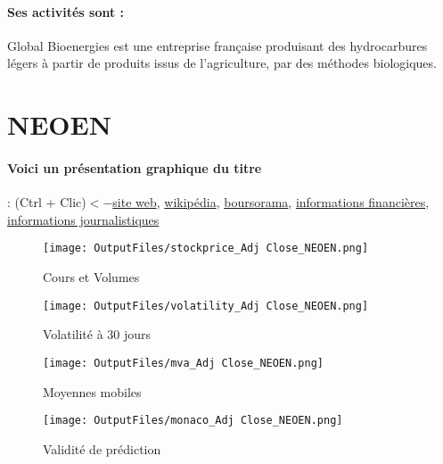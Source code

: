 \documentclass[11pt,a4paper]{report}%
\begin{document}
\paragraph{Ses activités sont : } Global Bioenergies est une entreprise française produisant des hydrocarbures légers à partir de produits issus de l'agriculture, par des méthodes biologiques. 
    
    \newpage

\section{NEOEN}

\paragraph{Voici un présentation graphique du titre} : (Ctrl + Clic)$<-$\href{https://www.neoen.com/fr/informations-financieres}{site web}, \href{https://fr.wikipedia.org/wiki/Neoen}{wikipédia}, \href{https://www.boursorama.com/cours/1rPNEOEN}{boursorama}, \href{https://www.qwant.com/?q=site:https:%2f%2fwww.easybourse.com%2faction-societe%2fNEOEN&t=web&client=ext-firefox-hp}{informations financières}, \href{https://bourse.lerevenu.com/cours-de-bourse/fiche-valeur-synthese/NEOEN/NEOEN-FR}{informations journalistiques}
\begin{figure}[!htb]
   \begin{minipage}{0.5\textwidth}
     \centering
     \texttt{[image: OutputFiles/stockprice\_Adj Close\_NEOEN.png]}
     \caption{Cours et Volumes}\label{Fig:price_NEOEN}
   \end{minipage}\hfill
   \begin{minipage}{0.5\textwidth}
     \centering
     \texttt{[image: OutputFiles/volatility\_Adj Close\_NEOEN.png]}
     \caption{Volatilité à 30 jours}\label{Fig:volat_NEOEN}
   \end{minipage}
\end{figure}
\begin{figure}[!htb]
   \begin{minipage}{0.5\textwidth}
     \centering
     \texttt{[image: OutputFiles/mva\_Adj Close\_NEOEN.png]}
     \caption{Moyennes mobiles}\label{Fig:mva_NEOEN}
   \end{minipage}\hfill
   \begin{minipage}{0.5\textwidth}
     \centering
     \texttt{[image: OutputFiles/monaco\_Adj Close\_NEOEN.png]}
     \caption{Validité de prédiction}\label{Fig:prediction_NEOEN}
   \end{minipage}
\end{figure}
\end{document}
